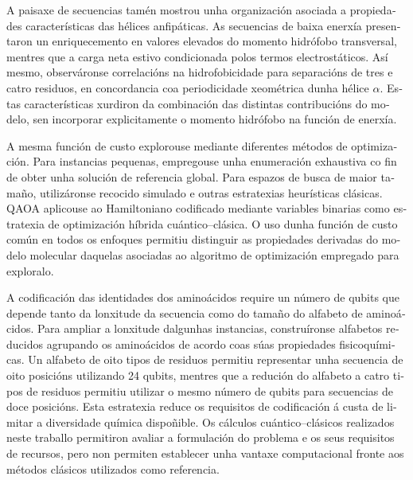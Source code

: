 \begin{otherlanguage}{galician}
A paisaxe de secuencias tamén mostrou unha organización asociada a propiedades características das hélices anfipáticas. As secuencias de baixa enerxía presentaron un enriquecemento en valores elevados do momento hidrófobo transversal, mentres que a carga neta estivo condicionada polos termos electrostáticos. Así mesmo, observáronse correlacións na hidrofobicidade para separacións de tres e catro residuos, en concordancia coa periodicidade xeométrica dunha hélice $\alpha$. Estas características xurdiron da combinación das distintas contribucións do modelo, sen incorporar explicitamente o momento hidrófobo na función de enerxía.

A mesma función de custo explorouse mediante diferentes métodos de optimización. Para instancias pequenas, empregouse unha enumeración exhaustiva co fin de obter unha solución de referencia global. Para espazos de busca de maior tamaño, utilizáronse recocido simulado e outras estratexias heurísticas clásicas. QAOA aplicouse ao Hamiltoniano codificado mediante variables binarias como estratexia de optimización híbrida cuántico–clásica. O uso dunha función de custo común en todos os enfoques permitiu distinguir as propiedades derivadas do modelo molecular daquelas asociadas ao algoritmo de optimización empregado para exploralo.

A codificación das identidades dos aminoácidos require un número de qubits que depende tanto da lonxitude da secuencia como do tamaño do alfabeto de aminoácidos. Para ampliar a lonxitude dalgunhas instancias, construíronse alfabetos reducidos agrupando os aminoácidos de acordo coas súas propiedades fisicoquímicas. Un alfabeto de oito tipos de residuos permitiu representar unha secuencia de oito posicións utilizando 24 qubits, mentres que a redución do alfabeto a catro tipos de residuos permitiu utilizar o mesmo número de qubits para secuencias de doce posicións. Esta estratexia reduce os requisitos de codificación á custa de limitar a diversidade química dispoñible. Os cálculos cuántico–clásicos realizados neste traballo permitiron avaliar a formulación do problema e os seus requisitos de recursos, pero non permiten establecer unha vantaxe computacional fronte aos métodos clásicos utilizados como referencia.


\end{otherlanguage}
